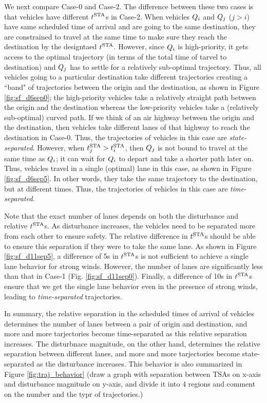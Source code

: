 We next compare Case-0 and Case-2. The difference between these two cases is that vehicles have different $t^\text{STA}$s in Case-2. When vehicles $Q_i$ and $Q_{j}$ ($j>i$) have same scheduled time of arrival and are going to the same destination, they are constrained to travel at the same time to make sure they reach the destination by the designtaed $t^\text{STA}$. However, since $Q_i$ is high-priority, it gets access to the optimal trajectory (in terms of the total time of tarvel to destination) and $Q_{j}$ has to settle for a relatively sub-optimal trajectory. Thus, all vehicles going to a particular destination take different trajectories creating a ``band" of trajectories between the origin and the destination, as shown in Figure \ref{fig:sf_d6sep0}; the high-priority vehicles take a relatively straight path between the origin and the destination whereas the low-priority vehicles take a (relatively sub-optimal) curved path. If we think of an air highway between the origin and the destination, then vehicles take different lanes of that highway to reach the destination in Case-0. Thus, the trajectories of vehicles in this case are \textit{state-separated}. However, when $t^\text{STA}_j > t^\text{STA}_i$, then $Q_j$ is not bound to travel at the same time as $Q_i$; it can wait for $Q_i$ to depart and take a shorter path later on. Thus, vehicles travel in a single (optimal) lane in this case, as shown in Figure \ref{fig:sf_d6sep5}. In other words, they take the same trajectory to the destination, but at different times. Thus, the trajectories of vehicles in this case are \textit{time-separated}. 

Note that the exact number of lanes depends on both the disturbance and relative $t^\text{STA}$s. As disturbance increases, the vehicles need to be separated more from each other to ensure safety. The relative difference in $t^\text{STA}$s should be able to ensure this separation if they were to take the same lane. As shown in Figure \ref{fig:sf_d11sep5}, a difference of 5s in $t^\text{STA}$s is not sufficient to achieve a single lane behavior for strong winds. However, the number of lanes are significantly less than that in Case-1 (Fig. \ref{fig:sf_d11sep0}). Finally, a difference of 10s in $t^\text{STA}$s ensure that we get the single lane behavior even in the presence of strong winds, leading to \textit{time-separated} trajectories.

In summary, the relative separation in the scheduled times of arrival of vehicles determines the number of lanes between a pair of origin and destination, and more and more tarjectories become time-separated as this relative separation increases. The disturbnace magnitude, on the other hand, determines the relative separation between different lanes, and more and more tarjectories become state-separated as the disturbance increases. This behavior is also summarized in Figure \ref{fig:traj_behavior} (draw a graph with separation between TSAs on x-axis and disturbance magnitude on y-axis, and divide it into 4 regions and comment on the number and the typr of trajectories.)


